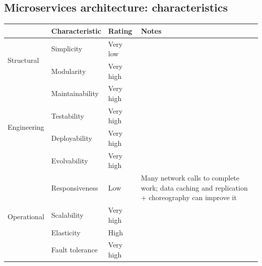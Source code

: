 \newpage
\subsection{Microservices architecture: characteristics}

\begin{table}[h!]
  \renewcommand{\arraystretch}{1.4}
  \centering
  \begin{tabularx}{\textwidth}{lllX}
    \toprule
     & \textbf{Characteristic} & \textbf{Rating} & \textbf{Notes}                                                                                  \\
    \midrule
    \multirow{2}{*}{Structural}
     & Simplicity              & Very low        &                                                                                                 \\
     & Modularity              & Very high       &                                                                                                 \\
    \midrule
    \multirow{4}{*}{Engineering}
     & Maintainability         & Very high       &                                                                                                 \\
     & Testability             & Very high       &                                                                                                 \\
     & Deployability           & Very high       &                                                                                                 \\
     & Evolvability            & Very high       &                                                                                                 \\
    \midrule
    \multirow{4}{*}{Operational}
     & Responsiveness          & Low             & Many network calls to complete work; data caching and replication + choreography can improve it \\
     & Scalability             & Very high       &                                                                                                 \\
     & Elasticity              & High            &                                                                                                 \\
     & Fault tolerance         & Very high       &                                                                                                 \\
    \bottomrule
  \end{tabularx}
\end{table}

